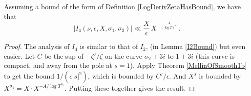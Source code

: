 \begin{lemma}[I4GenBound]
\label{I4GenBound}
\leanok
Assuming a bound of the form of Definition \ref{LogDerivZetaHasBound}, we have that
  $$
  \left|I_4(\nu,\epsilon,X,\sigma_1,\sigma_2)\right|
    \ll\frac{X}{\epsilon}\,X^{-\frac{A}{(\log T)^{n_1}}}.
  $$
\end{lemma}
\begin{proof}
\leanok
The analysis of $I_4$ is similar to that of $I_2$, (in Lemma \ref{I2Bound}) but even easier.
    Let $C$ be the sup of $-\zeta'/\zeta$ on the curve $\sigma_2 + 3 i$ to $1+ 3i$
    (this curve is compact, and away from the pole at $s=1$). Apply Theorem \ref{MellinOfSmooth1b}
    to get the bound $1/(\epsilon |s|^2)$, which is bounded by $C'/\epsilon$. And $X^s$ is bounded
    by $X^{\sigma_1}=X \cdot X^{-A/ \log T^{n_1}}$. Putting these together gives the result.
\end{proof}
